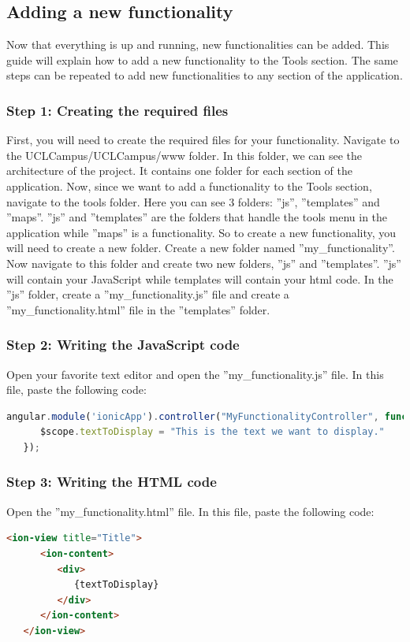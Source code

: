 \documentclass[11pt, a4paper]{report}
\begin{document}
\subsection{Adding a new functionality}
Now that everything is up and running, new functionalities can be added. This guide will explain how to add a new functionality to the Tools section. The same steps can be repeated to add new functionalities to any section of the application.
\subsubsection{Step 1: Creating the required files}
First, you will need to create the required files for your functionality. Navigate to the UCLCampus/UCLCampus/www folder. In this folder, we can see the architecture of the project. It contains one folder for each section of the application. Now, since we want to add a functionality to the Tools section, navigate to the tools folder. Here you can see 3 folders: ''js'', ''templates'' and ''maps''. ''js'' and ''templates'' are the folders that handle the tools menu in the application while ''maps'' is a functionality. So to create a new functionality, you will need to create a new folder.
Create a new folder named ''my\_functionality''. Now navigate to this folder and create two new folders, ''js'' and ''templates''. ''js'' will contain your JavaScript while templates will contain your html code. In the ''js'' folder, create a ''my\_functionality.js'' file and create a ''my\_functionality.html'' file in the ''templates'' folder.
\subsubsection{Step 2: Writing the JavaScript code}
Open your favorite text editor and open the ''my\_functionality.js'' file. In this file, paste the following code:
\begin{lstlisting}[language=JavaScript]
   angular.module('ionicApp').controller("MyFunctionalityController", function($scope) {
      $scope.textToDisplay = "This is the text we want to display."
   });
\end{lstlisting} 
\subsubsection{Step 3: Writing the HTML code}
Open the ''my\_functionality.html'' file.   In this file, paste the following code:
\begin{lstlisting}[language=HTML]
   <ion-view title="Title">
      <ion-content>
         <div>
            {textToDisplay}
         </div>
      </ion-content>
   </ion-view>	
\end{lstlisting} 
\end{document}
